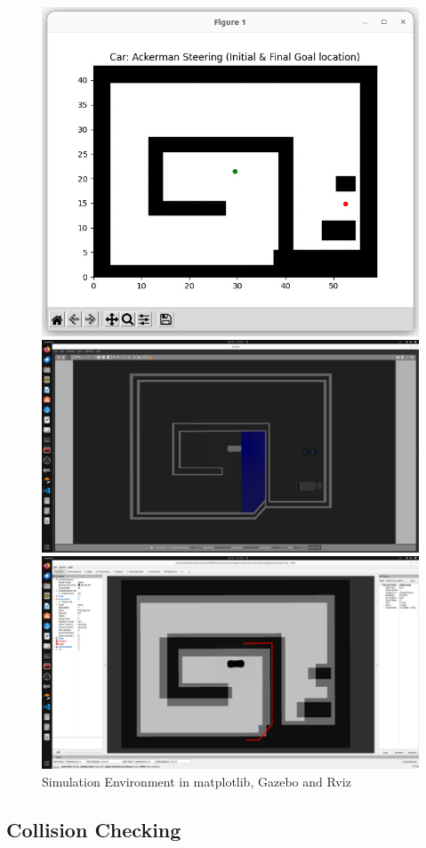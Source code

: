 \documentclass[12pt,a4paper]{article}
\begin{document}
\begin{figure}[htbp!]
\begin{center}
\includegraphics[width=0.6\columnwidth]{images/Car_state_initialization.jpeg}\par \vspace{3mm}
\includegraphics[width=0.6\columnwidth]{images/Gazebo_states_initialization.jpeg}\par
\vspace{3mm}
\includegraphics[width=0.6\columnwidth]{images/Rviz_state_initialization.jpeg}
\end{center}
\caption{Simulation Environment in matplotlib, Gazebo and Rviz}
\label{fig:simulation_flowchart}
\end{figure}


\subsection{Collision Checking}\label{sec:Collision Checking} \par
\end{document}
